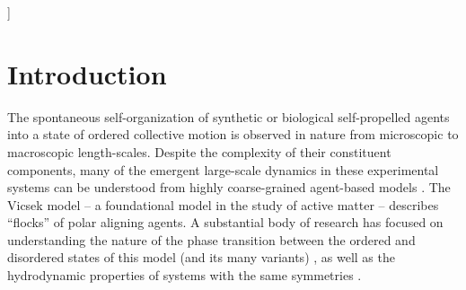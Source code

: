 \documentclass[twoside,twocolumn,9pt]{article}
\begin{document}
  ]

\renewcommand*\rmdefault{bch}\normalfont\upshape
\rmfamily
\section*{}
\vspace{-1cm}







\section{Introduction}

The spontaneous self-organization of synthetic or biological self-propelled agents into a state of ordered collective motion is observed in nature from microscopic \cite{chen2017weak} to macroscopic \cite{bazazi2008collective,sugi2019c,cavagna2010scale} length-scales.
Despite the complexity of their constituent components, many of the emergent large-scale dynamics in these experimental systems can be understood from highly coarse-grained agent-based models \cite{sumino2012large,chen2017weak,xu2024self}.
The Vicsek model \cite{vicsek1995novel} -- a foundational model in the study of active matter -- describes ``flocks'' of polar aligning agents.
A substantial body of research has focused on understanding the nature of the phase transition between the ordered and disordered states of this model (and its many variants) \cite{nagai2015collective,zhao2021phases}, as well as the hydrodynamic properties of systems with the same symmetries \cite{toner2005hydrodynamics}.
\end{document}
